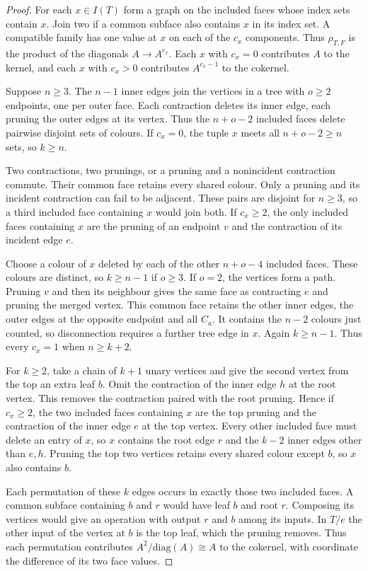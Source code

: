 \begin{proof}
For each $x\in I(T)$ form a graph on the included faces whose index sets
contain $x$. Join two if a common subface also contains $x$ in its index set.
A compatible family has one value at $x$ on each of the $c_x$ components.
Thus $\rho_{T,F}$ is the product of the diagonals $A\to A^{c_x}$.
Each $x$ with $c_x=0$ contributes $A$ to the kernel, and each $x$ with
$c_x>0$ contributes $A^{c_x-1}$ to the cokernel.

Suppose $n\geq3$. The $n-1$ inner edges join the
vertices in a tree with $o\geq2$ endpoints, one per outer face.
Each contraction deletes its inner edge, each pruning the outer edges at
its vertex. Thus the $n+o-2$ included faces delete pairwise disjoint
sets of colours. If $c_x=0$, the tuple $x$ meets all $n+o-2\geq n$ sets,
so $k\geq n$.

Two contractions, two prunings, or a pruning and a nonincident contraction
commute. Their common face retains every shared colour. Only a pruning
and its incident contraction can fail to be adjacent. These pairs are
disjoint for $n\geq3$, so a third included face containing $x$ would join both.
If $c_x\geq2$, the only included faces containing $x$ are the pruning of an endpoint
$v$ and the contraction of its incident edge $e$.

Choose a colour of $x$ deleted by each of the other $n+o-4$ included faces.
These colours are distinct, so $k\geq n-1$ if $o\geq3$. If $o=2$, the vertices form a path. Pruning
$v$ and then its neighbour gives the same face as contracting $e$ and pruning
the merged vertex. This common face retains the other inner edges, the
outer edges at the opposite endpoint and all $C_a$. It contains the $n-2$
colours just counted, so disconnection requires a further tree edge in $x$.
Again $k\geq n-1$.
Thus every $c_x=1$ when $n\geq k+2$.

For $k\geq2$, take a chain of $k+1$ unary vertices and give the second vertex
from the top an extra leaf $b$. Omit the contraction of the inner edge $h$
at the root vertex. This removes the contraction paired with the root pruning.
Hence if $c_x\geq2$, the two included faces containing $x$ are the top pruning
and the contraction of the inner edge $e$ at the top vertex.
Every other included face must delete an entry of $x$, so $x$ contains the
root edge $r$ and the $k-2$ inner edges other than $e,h$. Pruning the top
two vertices retains every shared colour except $b$, so $x$ also contains $b$.

Each permutation of these $k$ edges occurs in exactly those two included faces. A common
subface containing $b$ and $r$ would have leaf $b$ and root $r$. Composing
its vertices would give an operation with output $r$ and $b$ among its inputs.
In $T/e$ the other input of the vertex at $b$ is the top leaf, which the
pruning removes. Thus each permutation contributes $A^2/\mathrm{diag}(A)\cong A$
to the cokernel, with coordinate the difference of its two face values.


\end{proof}
